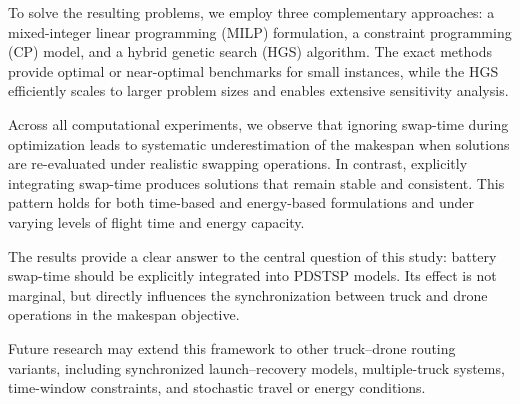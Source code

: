 \documentclass[3p, authoryear, 11pt]{elsarticle}
\begin{document}
To solve the resulting problems, we employ three complementary approaches:
a mixed-integer linear programming (MILP) formulation,
a constraint programming (CP) model,
and a hybrid genetic search (HGS) algorithm.
The exact methods provide optimal or near-optimal benchmarks for small instances,
while the HGS efficiently scales to larger problem sizes and enables extensive sensitivity analysis.

Across all computational experiments,
we observe that ignoring swap-time during optimization leads to systematic underestimation of the makespan
when solutions are re-evaluated under realistic swapping operations.
In contrast, explicitly integrating swap-time produces solutions that remain stable and consistent.
This pattern holds for both time-based and energy-based formulations
and under varying levels of flight time and energy capacity.

The results provide a clear answer to the central question of this study:
battery swap-time should be explicitly integrated into PDSTSP models.
Its effect is not marginal, but directly influences the synchronization between truck and drone operations
in the makespan objective.

Future research may extend this framework to other truck–drone routing variants,
including synchronized launch–recovery models, multiple-truck systems,
time-window constraints, and stochastic travel or energy conditions.

% 


\end{document}
